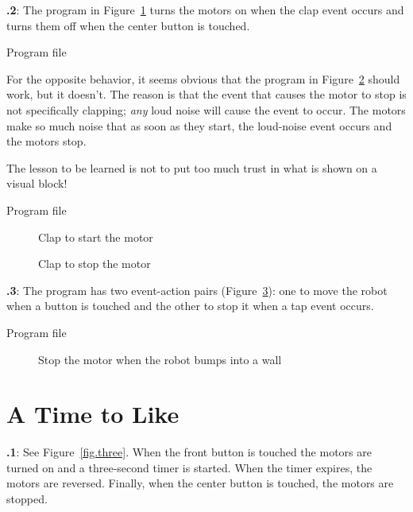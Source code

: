 \documentclass[12pt,a4paper,english]{article}
\begin{document}
\textbf{\thesection.2}: The program in Figure~\ref{fig.clap-to-start} turns the motors on when
the clap event occurs and turns them off when the center button is
touched.

{\raggedleft \hfill Program file }

For the opposite behavior, it seems obvious that the program in
Figure~\ref{fig.clap-to-stop} should work, but it doesn't. The reason is
that the event that causes the motor to stop is not specifically
clapping; \emph{any} loud noise will cause the event to occur. The
motors make so much noise that as soon as they start, the loud-noise
event occurs and the motors stop.

The lesson to be learned is not to put
too much trust in what is shown on a visual block!

{\raggedleft \hfill Program file }

\begin{figure}
\begin{center}
\caption{Clap to start the motor}\label{fig.clap-to-start}
\end{center}
\end{figure}

\begin{figure}[hbt]
\begin{center}
\caption{Clap to stop the motor}\label{fig.clap-to-stop}
\end{center}
\end{figure}

\textbf{\thesection.3}:
The program has two event-action pairs (Figure~\ref{fig.bump}): one to
move the robot when a button is touched and the other to stop it when a
tap event occurs.

{\raggedleft \hfill Program file }

\begin{figure}[hbt]
\begin{center}
\caption{Stop the motor when the robot bumps into a wall}\label{fig.bump}
\end{center}
\end{figure}


\section{A Time to Like}

\textbf{\thesection.1}:
See Figure~\ref{fig.three}. When the front button
is touched the motors are turned on and a three-second timer is started.
When the timer expires, the motors are reversed. Finally, when the
center button is touched, the motors are stopped.
\end{document}
